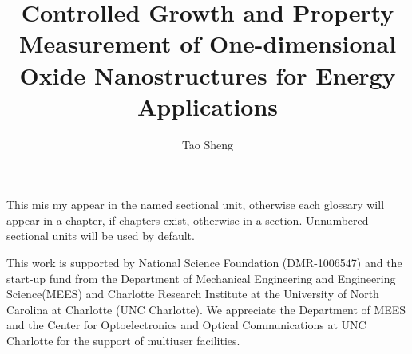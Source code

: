 
  \title{Controlled Growth and Property Measurement of One-dimensional Oxide Nanostructures for Energy Applications}
  \author{Tao Sheng}
  \thesisyear{\the\year}



\maketitle




\begin{dedication}
This mis my appear in the named sectional unit, otherwise each glossary will
appear in a chapter, if chapters exist, otherwise in a section. Unnumbered
sectional units will be used by default.
\end{dedication}


\begin{ackn}
This work is supported by National Science Foundation (DMR-1006547) and the start-up fund from the Department of Mechanical Engineering and Engineering Science(MEES) and Charlotte Research Institute at the University of North Carolina at Charlotte (UNC Charlotte). We appreciate the Department of MEES and the Center for Optoelectronics and Optical Communications at UNC Charlotte for the support of multiuser facilities.
\end{ackn}
\setcounter{tocdepth}{2}

\clearpage
\tableofcontents
\clearpage
\listoftables
\clearpage
\listoffigures
\begin{singlespace}
\renewcommand{\glossarypreamble}{\thispagestyle{myheadings}}
\renewcommand{\acronymname}{LIST OF ABBREVIATIONS}
\printglossary[type=\acronymtype]
\clearpage
\end{singlespace}


\pagebreak{} 